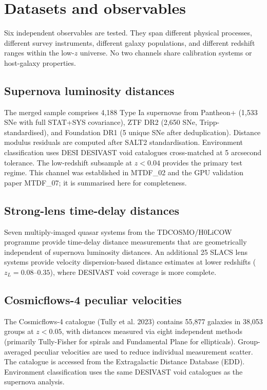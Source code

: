 \documentclass[11pt,a4paper]{article}
\begin{document}
\section{Datasets and observables}
\label{sec:sec3}
Six independent observables are tested. They span different physical processes, different survey instruments, different galaxy populations, and different redshift ranges within the low-\(z\) universe. No two channels share calibration systems or host-galaxy properties.

\subsection{Supernova luminosity distances}
The merged sample comprises 4,188 Type Ia supernovae from Pantheon+ (1,533 SNe with full STAT+SYS covariance), ZTF DR2 (2,650 SNe, Tripp-standardised), and Foundation DR1 (5 unique SNe after deduplication). Distance modulus residuals are computed after SALT2 standardisation. Environment classification uses DESI DESIVAST void catalogues cross-matched at 5 arcsecond tolerance. The low-redshift subsample at \(z < 0.04\) provides the primary test regime. This channel was established in MTDF\_\allowbreak{}02 and the GPU validation paper MTDF\_\allowbreak{}07; it is summarised here for completeness.

\subsection{Strong-lens time-delay distances}
Seven multiply-imaged quasar systems from the TDCOSMO/\allowbreak{}H0LiCOW programme provide time-delay distance measurements that are geometrically independent of supernova luminosity distances. An additional 25 SLACS lens systems provide velocity dispersion-based distance estimates at lower redshifts (\(z_L = 0.08\text{--}0.35\)), where DESIVAST void coverage is more complete.

\subsection{Cosmicflows-4 peculiar velocities}
The Cosmicflows-4 catalogue (Tully et al. 2023) contains 55,877 galaxies in 38,053 groups at \(z < 0.05\), with distances measured via eight independent methods (primarily Tully-Fisher for spirals and Fundamental Plane for ellipticals). Group-averaged peculiar velocities are used to reduce individual measurement scatter. The catalogue is accessed from the Extragalactic Distance Database (EDD). Environment classification uses the same DESIVAST void catalogues as the supernova analysis.
\end{document}
